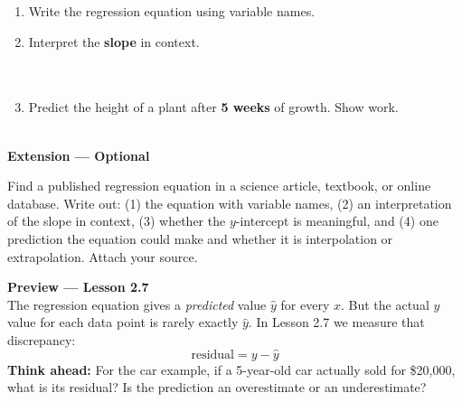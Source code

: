\documentclass[10pt]{article}
\begin{document}
\vspace{10pt}

\begin{enumerate}[label=\textbf{(\alph*)}, leftmargin=2em, itemsep=0.18in]

  \item Write the regression equation using variable names.\\[8pt]
        \writeline

  \item Interpret the \textbf{slope} in context.\\[8pt]
        \writeline\\[3pt]\writeline\\[3pt]\writeline

  \item Predict the height of a plant after \textbf{5 weeks} of growth.
        Show work.\\[8pt]
        \writeline\\[3pt]\writeline

\end{enumerate}

\vspace{0.18in}

\begin{extensionbox}
\small\textbf{Extension --- Optional}

Find a published regression equation in a science article, textbook, or online database.
Write out: (1) the equation with variable names, (2) an interpretation of the slope in
context, (3) whether the $y$-intercept is meaningful, and (4) one prediction the equation
could make and whether it is interpolation or extrapolation. Attach your source.
\end{extensionbox}

\vspace{0.16in}

\begin{tcolorbox}[colback=greenbg, colframe=greenacc, boxrule=0.8pt, arc=2mm,
    left=4mm, right=4mm, top=3mm, bottom=3mm]
\small\textbf{Preview --- Lesson 2.7}\\[4pt]
The regression equation gives a \emph{predicted} value $\hat{y}$ for every $x$. But the
actual $y$ value for each data point is rarely exactly $\hat{y}$. In Lesson 2.7 we measure
that discrepancy:
\[
  \text{residual} = y - \hat{y}
\]
\textbf{Think ahead:} For the car example, if a 5-year-old car actually sold for \$20{,}000,
what is its residual? Is the prediction an overestimate or an underestimate?\\[6pt]
\writeline\\[2pt]\writeline
\end{tcolorbox}
\end{document}
